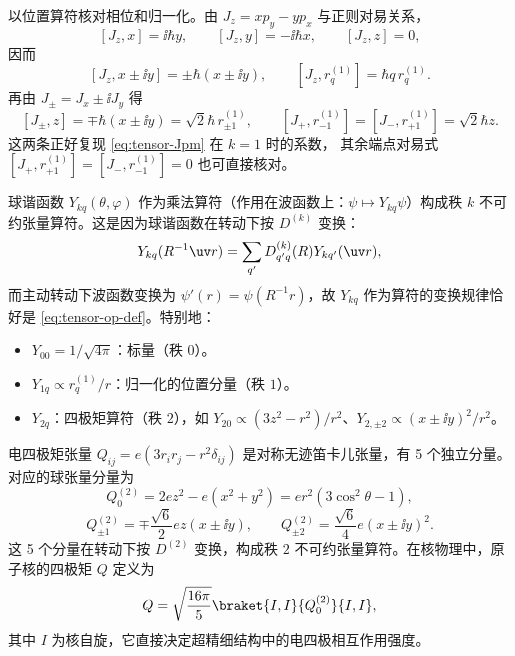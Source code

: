 以位置算符核对相位和归一化。由
$J_z=xp_y-yp_x$ 与正则对易关系，
\[
[J_z,x]=\ii\hbar y,\qquad [J_z,y]=-\ii\hbar x,
\qquad [J_z,z]=0,
\]
因而
\[
[J_z,x\pm\ii y]=\pm\hbar(x\pm\ii y),\qquad
[J_z,r^{(1)}_q]=\hbar q\,r^{(1)}_q.
\]
再由 $J_\pm=J_x\pm\ii J_y$ 得
\[
[J_\pm,z]=\mp\hbar(x\pm\ii y)
=\sqrt2\hbar\,r^{(1)}_{\pm1},
\qquad
[J_+,r^{(1)}_{-1}]=[J_-,r^{(1)}_{+1}]=\sqrt2\hbar z.
\]
这两条正好复现 \cref{eq:tensor-Jpm} 在 $k=1$ 时的系数，
其余端点对易式 $[J_+,r^{(1)}_{+1}]=[J_-,r^{(1)}_{-1}]=0$ 也可直接核对。

球谐函数 $Y_{kq}(\theta,\varphi)$ 作为乘法算符（作用在波函数上：$\psi\mapsto Y_{kq}\psi$）构成秩 $k$ 不可约张量算符。这是因为球谐函数在转动下按 $D^{(k)}$ 变换：
\[
Y_{kq}(R^{-1}\uv r)=\sum_{q'}D^{(k)}_{q'q}(R)Y_{kq'}(\uv r),
\]
而主动转动下波函数变换为 $\psi'(r)=\psi(R^{-1}r)$，故 $Y_{kq}$ 作为算符的变换规律恰好是 \cref{eq:tensor-op-def}。特别地：
\begin{itemize}
\item $Y_{00}=1/\sqrt{4\pi}$：标量（秩 $0$）。
\item $Y_{1q}\propto r^{(1)}_q/r$：归一化的位置分量（秩 $1$）。
\item $Y_{2q}$：四极矩算符（秩 $2$），如 $Y_{20}\propto(3z^2-r^2)/r^2$、$Y_{2,\pm2}\propto(x\pm\ii y)^2/r^2$。
\end{itemize}

电四极矩张量 $Q_{ij}=e(3r_ir_j-r^2\delta_{ij})$ 是对称无迹笛卡儿张量，有 5 个独立分量。对应的球张量分量为
\[
Q^{(2)}_0=2ez^2-e(x^2+y^2)=er^2(3\cos^2\theta-1),
\]
\[
Q^{(2)}_{\pm1}=\mp\frac{\sqrt6}{2}e z(x\pm\ii y),\qquad
Q^{(2)}_{\pm2}=\frac{\sqrt6}{4}e(x\pm\ii y)^2.
\]
这 5 个分量在转动下按 $D^{(2)}$ 变换，构成秩 $2$ 不可约张量算符。在核物理中，原子核的四极矩 $Q$ 定义为
\[
Q=\sqrt{\frac{16\pi}{5}}\braket{I,I}{Q^{(2)}_0}{I,I},
\]
其中 $I$ 为核自旋，它直接决定超精细结构中的电四极相互作用强度。

